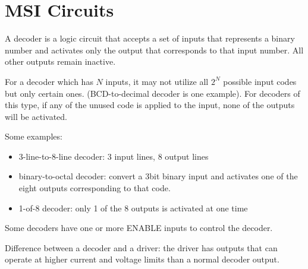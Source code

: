 \chapter{MSI Circuits}

    \par A decoder is a logic circuit that accepts a set of inputs that
      represents a binary number and activates only the output that
      corresponds to that input number. All other outputs remain inactive.

    \par For a decoder which has $N$ inputs, it may not utilize all $2^{N}$
      possible input codes but only certain ones. (BCD-to-decimal decoder is
      one example). For decoders of this type, if any of the unused code is
      applied to the input, none of the outputs will be activated.

    \par Some examples:
    \begin{itemize}
      \item 3-line-to-8-line decoder: 3 input lines, 8 output lines
      \item binary-to-octal decoder: convert a 3bit binary input and activates
        one of the eight outputs corresponding to that code.
      \item 1-of-8 decoder: only 1 of the 8 outputs is activated at one time
    \end{itemize}

    \par Some decoders have one or more ENABLE inputs to control the decoder.

    \par Difference between a decoder and a driver: the driver has
       outputs that can operate at higher current
      and voltage limits than a normal decoder output.

